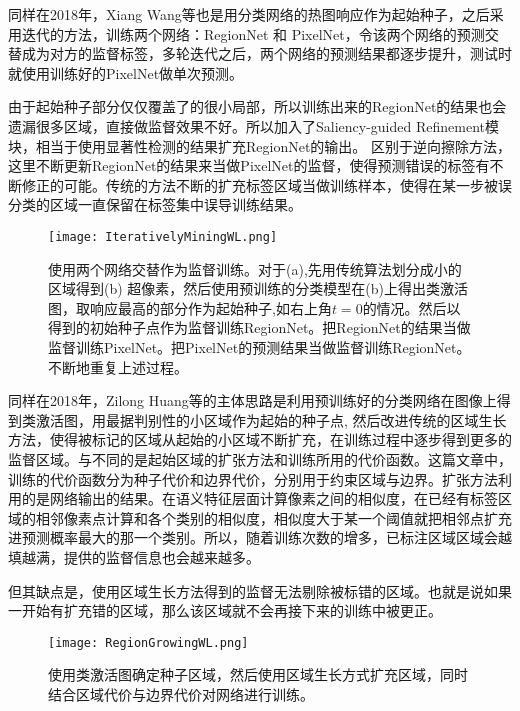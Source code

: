 同样在2018年，Xiang Wang等\cite{wang2018weakly}也是用分类网络的热图响应作为起始种子，之后采用迭代的方法，训练两个网络：RegionNet 和 PixelNet，令该两个网络的预测交替成为对方的监督标签，多轮迭代之后，两个网络的预测结果都逐步提升，测试时就使用训练好的PixelNet做单次预测。

由于起始种子部分仅仅覆盖了的很小局部，所以训练出来的RegionNet的结果也会遗漏很多区域，直接做监督效果不好。所以加入了Saliency-guided Refinement模块，相当于使用显著性检测的结果扩充RegionNet的输出。 区别于逆向擦除方法，这里不断更新RegionNet的结果来当做PixelNet的监督，使得预测错误的标签有不断修正的可能。传统的方法不断的扩充标签区域当做训练样本，使得在某一步被误分类的区域一直保留在标签集中误导训练结果。
\begin{figure}[ht]
\begin{center}
\texttt{[image: IterativelyMiningWL.png]}
\end{center}
\caption{使用两个网络交替作为监督训练\cite{wang2018weakly}。对于(a),先用传统算法划分成小的区域得到(b) 超像素，然后使用预训练的分类模型在(b)上得出类激活图，取响应最高的部分作为起始种子,如右上角$t = 0$的情况。然后以得到的初始种子点作为监督训练RegionNet。把RegionNet的结果当做监督训练PixelNet。把PixelNet的预测结果当做监督训练RegionNet。不断地重复上述过程。}
\label{fig:IterativelyMiningWL}
\end{figure}


同样在2018年，Zilong Huang等\cite{huang2018weakly}的主体思路是利用预训练好的分类网络在图像上得到类激活图，用最据判别性的小区域作为起始的种子点, 然后改进传统的区域生长方法，使得被标记的区域从起始的小区域不断扩充，在训练过程中逐步得到更多的监督区域。与\cite{wang2018weakly}不同的是起始区域的扩张方法和训练所用的代价函数。这篇文章中，训练的代价函数分为种子代价和边界代价，分别用于约束区域与边界。扩张方法利用的是网络输出的结果。在语义特征层面计算像素之间的相似度，在已经有标签区域的相邻像素点计算和各个类别的相似度，相似度大于某一个阈值就把相邻点扩充进预测概率最大的那一个类别。所以，随着训练次数的增多，已标注区域区域会越填越满，提供的监督信息也会越来越多。

但其缺点是，使用区域生长方法得到的监督无法剔除被标错的区域。也就是说如果一开始有扩充错的区域，那么该区域就不会再接下来的训练中被更正。
\begin{figure}[htbp]
\begin{center}
\texttt{[image: RegionGrowingWL.png]}
\end{center}
\caption{使用类激活图确定种子区域，然后使用区域生长方式扩充区域，同时结合区域代价与边界代价对网络进行训练\cite{huang2018weakly}。}
\label{fig:RegionGrowingWL}
\end{figure}

